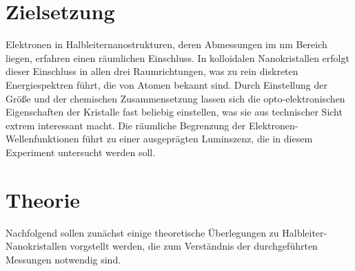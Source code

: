 \setcounter{page}{1}
\section*{Zielsetzung}
Elektronen in Halbleiternanostrukturen, deren Abmessungen im $\si{\nano\meter}$ Bereich liegen,
erfahren einen räumlichen Einschluss. In kolloidalen Nanokristallen erfolgt dieser Einschluss
in allen drei Raumrichtungen, was zu rein diskreten Energiespektren führt, die von Atomen bekannt sind.
Durch Einstellung der Größe und der chemischen Zusammensetzung lassen sich die opto-elektronischen
Eigenschaften der Kristalle fast beliebig einstellen, was sie aus technischer Sicht extrem interessant macht.
Die räumliche Begrenzung der Elektronen-Wellenfunktionen führt zu einer ausgeprägten Luminszenz, die
in diesem Experiment untersucht werden soll.

\section{Theorie}
Nachfolgend sollen zunächst einige theoretische Überlegungen zu Halbleiter-Nanokristallen vorgstellt werden, die
zum Verständnis der durchgeführten Messungen notwendig sind.

